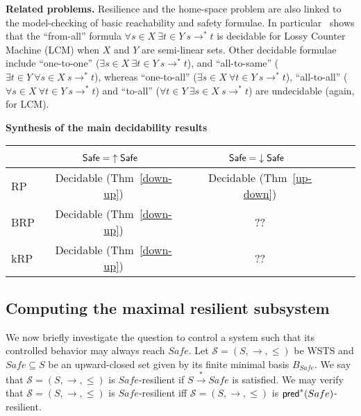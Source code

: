 {\bf Related problems.} 
Resilience and the home-space problem are also linked to the 
model-checking of basic reachability and safety formulae. 
In particular~\cite{DBLP:conf/rp/Schnoebelen10} shows that the ``from-all'' formula $\forall s \in X~ \exists t \in Y~ s \to^* t$
is decidable for Lossy Counter Machine (LCM)
when $X$ and $Y$ are semi-linear sets.
Other decidable formulae include ``one-to-one'' ($\exists s \in  X ~ \exists t \in  Y ~ s \to^* 
 t$), and ``all-to-same'' ($\exists t \in  Y ~ \forall s \in  X ~ s \to^*  t$),
whereas ``one-to-all'' ($\exists s \in  X ~ \forall t \in  Y ~ s \to^*  t$), 
``all-to-all'' ($\forall s \in  X ~ \forall t \in  Y ~ s \to^*  t$)
  and ``to-all'' ($\forall t \in  Y  ~ \exists s \in  X ~ s \to^*  t$) are undecidable (again, for LCM). 
  
  
  





{\bf Synthesis of the main decidability results}\label{synthesis}
\begin{center}
\begin{tabular}{ | l | c | c | c | r |}
\hline   \ %
		& $\textsf{Safe} = {\uparrow \textsf{Safe}}$~ 
		 & $\textsf{Safe} = {\downarrow \textsf{Safe}}$~ 
 \\ \hline
   RP %
   	& Decidable (Thm~\ref{down-up})  
   		 & Decidable (Thm~\ref{up-down}) 
    \\ \hline
   BRP %
   &  Decidable (Thm~\ref{down-up}) 
   		 & ?? 
    \\ \hline
      kRP %
      & Decidable (Thm~\ref{down-up}) 
      		& ?? 
       \\ \hline
 \end{tabular}
\end{center}


\subsection{Computing the maximal resilient subsystem}

We now briefly investigate the question to control a system such that its controlled behavior may always reach $Safe$.
%
Let $\mathscr{S}=(S, \rightarrow, \leq)$ be WSTS and $Safe \subseteq S$ be an upward-closed set given by its finite minimal basis $B_{Safe}$. 
%
We say that $\mathscr{S}=(S, \rightarrow, \leq)$ is $Safe$-resilient if $S  \xrightarrow{*} Safe$ is satisfied.  
%
We may verify that  $\mathscr{S}=(S, \rightarrow, \leq)$ is $Safe$-resilient iff  $\mathscr{S}=(S, \rightarrow, \leq)$ is $\textsf{pred}^*(Safe)$-resilient. 

